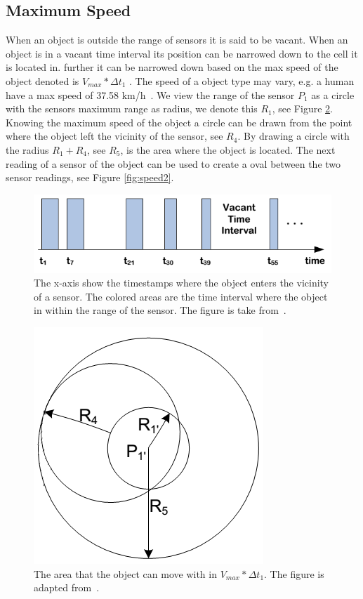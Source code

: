 \subsection{Maximum Speed}
\label{sec:speed}
When an object is outside the range of sensors it is said to be vacant.
When an object is in a vacant time interval its position can be narrowed down to the cell it is located in. 
further it can be narrowed down based on the max speed of the object denoted is $V_{max}*\Delta t_1$ . 
The speed of a object type may vary, e.g. a human have a max speed of 37.58 km/h~\cite{bolt}.
We view the range of the sensor $P_1$ as a circle with the sensors maximum range as radius, we denote this $R_1$, see Figure \ref{fig:speed1}.
Knowing the maximum speed of the object a circle can be drawn from the point where the object left the vicinity of the sensor, see $R_4$.
By drawing a circle with the radius $R_1 + R_4$, see $R_5$, is the area where the object is located. 
The next reading of a sensor of the object can be used to create a oval between the two sensor readings, see Figure \ref{fig:speed2}.  

\begin{figure}%
\centering
\includegraphics[width=\columnwidth]{images/vacant.png}%
\caption{The x-axis show the timestamps where the object enters the vicinity of a sensor. The colored areas are the time interval where the object in within the range of the sensor. The figure is take from~\cite{Jensen:2009:GMB:1590953.1591000}.}%
\label{fig:vacant}%
\end{figure}

\begin{figure}%
\centering
\includegraphics[width=0.5\columnwidth]{images/speed.png}%
\caption{The area that the object can move with in $V_{max}*\Delta t_1$. The figure is adapted from~\cite{Jensen:2009:GMB:1590953.1591000}.}%
\label{fig:speed1}%
\end{figure}

